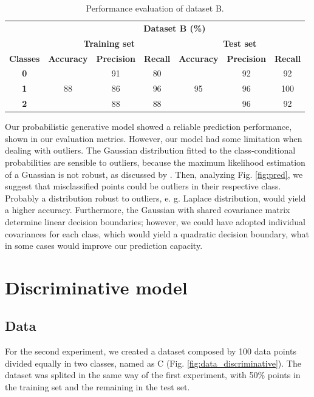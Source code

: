 \documentclass{article}
\begin{document}
\begin{table}[h]
  \centering
  \caption{Performance evaluation of dataset B.} \label{tab:3}
  \begin{tabular}{ccccccc}
  \cline{2-7}
   & \multicolumn{6}{c}{\textbf{Dataset B (\%)}} \\ \cline{2-7}
   & \multicolumn{3}{c}{\textbf{Training set}} & \multicolumn{3}{c}{\textbf{Test set}} \\ \hline
  \textbf{Classes} & \textbf{Accuracy} & \textbf{Precision} & \textbf{Recall} & \textbf{Accuracy} & \textbf{Precision} & \textbf{Recall} \\ \hline
  \textbf{0} & \multirow{3}{*}{88} & 91 & 80 & \multirow{3}{*}{95} & 92 & 92 \\ \cline{1-1} \cline{3-4} \cline{6-7} 
  \textbf{1} &  & 86 & 96 &  & 96 & 100 \\ \cline{1-1} \cline{3-4} \cline{6-7} 
  \textbf{2} &  & 88 & 88 &  & 96 & 92 \\ \hline
  \end{tabular}
  \end{table}

Our probabilistic generative model showed a reliable prediction performance, shown in our evaluation metrics. However, our model had some limitation when dealing with outliers. The Gaussian distribution fitted to the class-conditional probabilities are sensible to outliers, because the maximum likelihood estimation of a Guassian is not robust, as discussed by \cite{bishop2006}. Then, analyzing Fig. \ref{fig:pred}, we suggest that misclassified points could be outliers in their respective class. Probably a distribution robust to outliers, e. g. Laplace distribution, would yield a higher accuracy. Furthermore, the Gaussian with shared covariance matrix determine linear decision boundaries; however, we could have adopted individual covariances for each class, which would yield a quadratic decision boundary, what in some cases would improve our prediction capacity.

\section{Discriminative model}

\subsection{Data}

For the second experiment, we created a dataset composed by 100 data points divided equally in two classes, named as C (Fig. \ref{fig:data_discriminative}). The dataset was splited in the same way of the first experiment, with 50\% points in the training set and the remaining in the test set.
\end{document}
